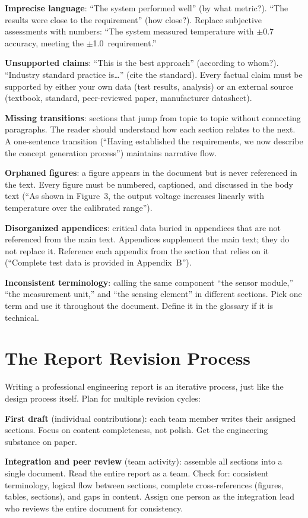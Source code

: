 \textbf{Imprecise language}: ``The system performed well'' (by what metric?). ``The results were close to the requirement'' (how close?). Replace subjective assessments with numbers: ``The system measured temperature with $\pm$0.7\,\degC{} accuracy, meeting the $\pm$1.0\,\degC{} requirement.''

\textbf{Unsupported claims}: ``This is the best approach'' (according to whom?). ``Industry standard practice is\ldots'' (cite the standard). Every factual claim must be supported by either your own data (test results, analysis) or an external source (textbook, standard, peer-reviewed paper, manufacturer datasheet).

\textbf{Missing transitions}: sections that jump from topic to topic without connecting paragraphs. The reader should understand how each section relates to the next. A one-sentence transition (``Having established the requirements, we now describe the concept generation process'') maintains narrative flow.

\textbf{Orphaned figures}: a figure appears in the document but is never referenced in the text. Every figure must be numbered, captioned, and discussed in the body text (``As shown in Figure~3, the output voltage increases linearly with temperature over the calibrated range'').

\textbf{Disorganized appendices}: critical data buried in appendices that are not referenced from the main text. Appendices supplement the main text; they do not replace it. Reference each appendix from the section that relies on it (``Complete test data is provided in Appendix~B'').

\textbf{Inconsistent terminology}: calling the same component ``the sensor module,'' ``the measurement unit,'' and ``the sensing element'' in different sections. Pick one term and use it throughout the document. Define it in the glossary if it is technical.

\section{The Report Revision Process}
Writing a professional engineering report is an iterative process, just like the design process itself. Plan for multiple revision cycles:

\textbf{First draft} (individual contributions): each team member writes their assigned sections. Focus on content completeness, not polish. Get the engineering substance on paper.

\textbf{Integration and peer review} (team activity): assemble all sections into a single document. Read the entire report as a team. Check for: consistent terminology, logical flow between sections, complete cross-references (figures, tables, sections), and gaps in content. Assign one person as the integration lead who reviews the entire document for consistency.

